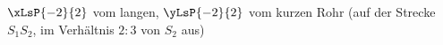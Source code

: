 $\xLsP{-2}{2}$ vom langen, $\yLsP{-2}{2}$ vom kurzen Rohr (auf der Strecke $S_1S_2$, im Verhältnis $2:3$ von $S_2$ aus)
